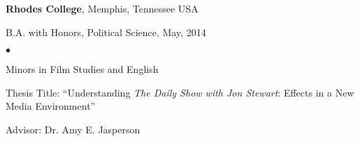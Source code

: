 \documentclass[margin,line]{res}
\newenvironment{list1}{
  \begin{list}{\ding{113}}{%
      \setlength{\itemsep}{0in}
      \setlength{\parsep}{0in} \setlength{\parskip}{0in}
      \setlength{\topsep}{0in} \setlength{\partopsep}{0in} 
      \setlength{\leftmargin}{0.17in}}}{\end{list}}
\newenvironment{list2}{
  \begin{list}{$\bullet$}{%
      \setlength{\itemsep}{0in}
      \setlength{\parsep}{0in} \setlength{\parskip}{0in}
      \setlength{\topsep}{0in} \setlength{\partopsep}{0in} 
      \setlength{\leftmargin}{0.2in}}}{\end{list}}
\begin{document}
\begin{resume}
{\bf Rhodes College}, Memphis, Tennessee USA\\
\vspace*{-.1in}
\begin{list1}
\item[] B.A. with Honors, Political Science,  May, 2014
\begin{list2}
\vspace*{.05in}
\item  Minors in Film Studies and English
\item Thesis Title: ``Understanding {\em The Daily Show with Jon Stewart}: Effects in a New Media Environment''
\item Advisor: Dr. Amy E. Jasperson
\end{list2}
\end{list1}







\end{resume}
\end{document}
